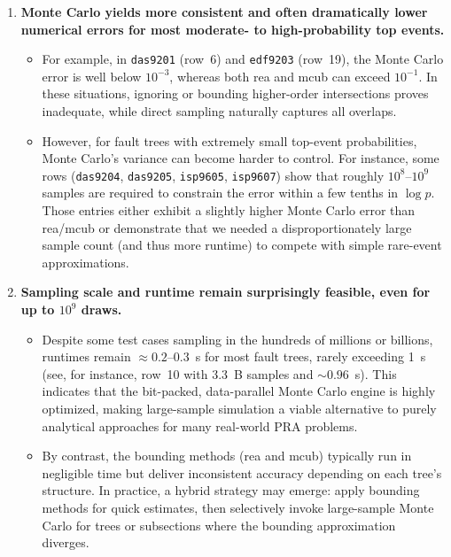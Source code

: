 \begin{enumerate}
    \item \textbf{Monte Carlo yields more consistent and often dramatically lower numerical errors for most moderate- to high-probability top events.}
    \begin{itemize}
        \item For example, in \texttt{das9201} (row~6) and \texttt{edf9203} (row~19), the Monte Carlo error is well below \(10^{-3}\), whereas both \acrshort{rea} and \acrshort{mcub} can exceed \(10^{-1}\). In these situations, ignoring or bounding higher-order intersections proves inadequate, while direct sampling naturally captures all overlaps.
        \item However, for fault trees with extremely small top-event probabilities, Monte Carlo's variance can become harder to control. For instance, some rows (\texttt{das9204}, \texttt{das9205}, \texttt{isp9605}, \texttt{isp9607}) show that roughly \(10^{8}\)–\(10^{9}\) samples are required to constrain the error within a few tenths in \(\log p\). Those entries either exhibit a slightly higher Monte Carlo error than \acrshort{rea}/\acrshort{mcub} or demonstrate that we needed a disproportionately large sample count (and thus more runtime) to compete with simple rare-event approximations.
    \end{itemize}

    \item \textbf{Sampling scale and runtime remain surprisingly feasible, even for up to \(10^{9}\) draws.}
    \begin{itemize}
        \item Despite some test cases sampling in the hundreds of millions or billions, runtimes remain \(\approx 0.2\)–\(0.3\)~s for most fault trees, rarely exceeding 1~s (see, for instance, row~10 with 3.3~B samples and \(\sim 0.96\)~s). This indicates that the bit-packed, data-parallel Monte Carlo engine is highly optimized, making large-sample simulation a viable alternative to purely analytical approaches for many real-world PRA problems.
        \item By contrast, the bounding methods (\acrshort{rea} and \acrshort{mcub}) typically run in negligible time but deliver inconsistent accuracy depending on each tree's structure. In practice, a hybrid strategy may emerge: apply bounding methods for quick estimates, then selectively invoke large-sample Monte Carlo for trees or subsections where the bounding approximation diverges.
    \end{itemize}


\end{enumerate}
